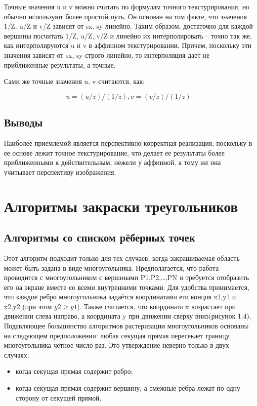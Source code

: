 \documentclass[12pt,a4paper,oneside]{report}
\begin{document}
 	 Точные значения u и v можно считать по формулам точного текстурирования, но обычно используют более простой путь. Он основан на том факте, что значения 1/Z, u/Z и v/Z зависят от sx, sy линейно. Таким образом, достаточно для каждой вершины посчитать 1/Z, u/Z, v/Z и линейно их интерполировать -- точно так же, как интерполируются u и v в аффинном текстурировании. Причем, поскольку эти значения зависят от sx, sy строго линейно, то интерполяция дает не приближенные результаты, а точные.
 	
 	Сами же точные значения u, v считаются, как:
 	
 	\begin{equation}
 	u = (u / z) / (1 / z),
 	v = (v / z) / (1 / z)
 	\end{equation}
 	
 	\subsection{Выводы}
 	 \quad Наиболее приемлемой является перспективно-корректная реализация, поскольку в ее основе лежит точное текстурирование, что делает ее результаты более приближенными к действительным, нежели у аффинной, к тому же она учитывает перспективу изображения. 
 	
 	\section {Алгоритмы закраски треугольников}
 	\subsection{Алгоритмы со списком рёберных точек}
 	 \quad Этот алгоритм подходит только для тех случаев, когда закрашиваемая область может быть задана в виде многоугольника. Предполагается, что  работа проводится с многоугольником с вершинами P1,P2,…,PN и требуется отобразить его на экране вместе со всеми внутренними точками. Для удобства принимается, что каждое ребро многоугольника задаётся координатами его концов x1,y1 и x2,y2 (при этом $y2 \geqslant y1$). Также считается, что координата x возрастает при движении слева направо, а координата y при движении сверху вниз(рисунок 1.4).
 	Подавляющее большинство алгоритмов растеризации многоугольников основаны на следующем предположении: любая секущая прямая пересекает границу многоугольника чётное число раз. Это утверждение неверно только в двух случаях:
 	\begin{itemize}
 		\item когда секущая прямая содержит ребро;
 		\item когда секущая прямая содержит вершину, а смежные рёбра лежат по одну сторону от секущей прямой.
 	\end{itemize}
 	
\end{document}
